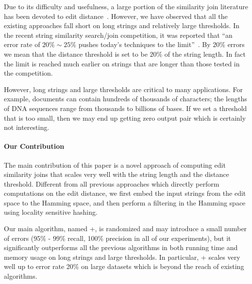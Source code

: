 Due to its difficulty and usefulness, a large portion of the similarity join literature has been devoted to edit distance~\cite{GJKMS01,AGK06,BMS07,BHSH07,LLL08,XWL08,WLF10,QWL11,WQX13,LDW11,WLF12}.  However, we have observed that all the existing approaches fall short on long strings and relatively large thresholds.  In the recent string similarity search/join competition, it was reported that ``an error rate of $20\% \sim 25\%$ pushes today's techniques to the limit''~\cite{WDG14}.  By  $20\%$ errors we mean that the distance threshold is set to be $20\%$ of the string length.  In fact the limit is reached much earlier on strings that are longer than those tested in the competition.  

However, long strings and large thresholds are critical to many applications. For example, documents can contain hundreds of thousands of characters; the lengths of DNA sequences range from thousands to billions of bases. If we set a threshold that is too small, then we may end up getting zero output pair which is certainly not interesting. %

\paragraph{Our Contribution}
The main contribution of this paper is a novel approach of computing edit similarity joins that scales very well with the string length and the distance threshold.  Different from all previous approaches which directly perform computations on the edit distance, we first embed the input strings from the edit space to the Hamming space, and then perform a filtering in the Hamming space using locality sensitive hashing.  

Our main algorithm, named \ebdjoin+, is randomized and may introduce a small number of errors (95\% - 99\% recall, 100\% precision in all of our experiments), but it significantly outperforms all the previous algorithms in both running time and memory usage on long strings and large thresholds.  In particular,  \ebdjoin+ scales very well up to error rate 20\% on large datasets which is beyond the reach of existing algorithms.



